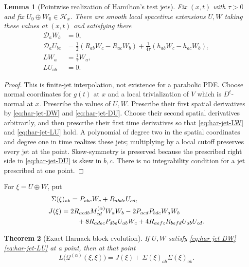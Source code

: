 \documentclass[10pt]{coll-l}
\newtheorem{theorem}{Theorem}[chapter]
\newtheorem{lemma}[theorem]{Lemma}
\theoremstyle{definition}
\theoremstyle{remark}
\numberwithin{section}{chapter}
\numberwithin{equation}{chapter}
\begin{document}
\begin{lemma}[Pointwise realization of Hamilton's test jets]
\label{lem:har-test-jet-realization}
Fix $(x,t)$ with $\tau>0$ and fix
$U_0\oplus W_0\in\mathcal H_x$.  There are smooth local spacetime
extensions $U,W$ taking these values at $(x,t)$ and satisfying there
\begin{align}
 \mathcal D_aW_b&=0,                                     \label{eq:har-jet-DW}\\
 \mathcal D_aU_{bc}
  &=\frac12(R_{ab}W_c-R_{ac}W_b)
     +\frac1{4\tau}(h_{ab}W_c-h_{ac}W_b),                \label{eq:har-jet-DU}\\
 LW_a&=\frac1\tau W_a,                                  \label{eq:har-jet-LW}\\
 LU_{ab}&=0.                                             \label{eq:har-jet-LU}
\end{align}
\end{lemma}

\begin{proof}
This is finite-jet interpolation, not existence for a parabolic PDE.  Choose
normal coordinates for $g(t)$ at $x$ and a local trivialization of $V$ which
is $D^t$-normal at $x$.  Prescribe the values of $U,W$.  Prescribe their
first spatial derivatives by \eqref{eq:har-jet-DW} and
\eqref{eq:har-jet-DU}.  Choose their second spatial derivatives arbitrarily,
and then prescribe their first time derivatives so that
\eqref{eq:har-jet-LW} and \eqref{eq:har-jet-LU} hold.  A polynomial of
degree two in the spatial coordinates and degree one in time realizes these
jets; multiplying by a local cutoff preserves every jet at the point.
Skew-symmetry is preserved because the prescribed right side in
\eqref{eq:har-jet-DU} is skew in $b,c$.  There is no integrability condition
for a jet prescribed at one point.
\end{proof}

For $\xi=U\oplus W$, put
\begin{align}
 \Sigma(\xi)_{ab}
   &=P_{abc}W_c+R_{abdc}U_{cd},                           \label{eq:har-Sigma}\\
 J(\xi)={}&2R_{acdb}M^{(\alpha)}_{cd}W_aW_b
            -2P_{acd}P_{bdc}W_aW_b                     \notag\\
 &\quad+8R_{adec}P_{dbe}U_{ab}W_c
            +4R_{aefc}R_{befd}U_{ab}U_{cd}.             \label{eq:har-J}
\end{align}

\begin{theorem}[Exact Harnack block evolution]
\label{thm:har-block-evolution}
If $U,W$ satisfy \eqref{eq:har-jet-DW}--\eqref{eq:har-jet-LU} at a point,
then at that point
\begin{equation}
 L\bigl(\mathscr Q^{(\alpha)}(\xi,\xi)\bigr)
      =J(\xi)+\Sigma(\xi)_{ab}\Sigma(\xi)_{ab}.          \label{eq:har-exact-Q-evolution}
\end{equation}
\end{theorem}
\end{document}
